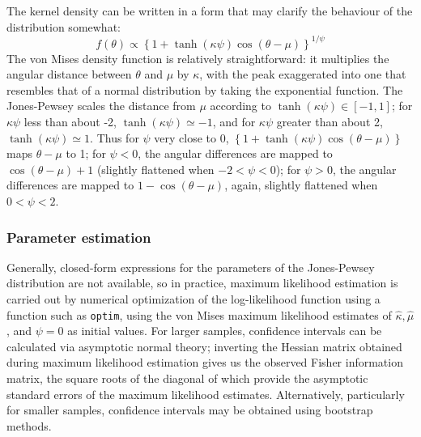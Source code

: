 \documentclass[../../ArchStats.tex]{subfiles}
\begin{document}


The kernel density can be written in a form that may clarify the behaviour of the distribution somewhat:
\[ f(\theta) \propto \left\lbrace 1 + \tanh(\kappa \psi) \cos (\theta - \mu) \right\rbrace ^{1/\psi}\]
The von Mises density function is relatively straightforward: it multiplies the angular distance between $\theta$ and $\mu$ by $\kappa$, with the peak exaggerated into one that resembles that of a normal distribution by taking the exponential function. The Jones-Pewsey scales the distance from $\mu$ according to $\tanh(\kappa\psi) \in [-1,1] $; for $\kappa \psi$ less than about -2, $\tanh(\kappa\psi) \simeq -1$, and for $\kappa \psi$ greater than about 2, $\tanh(\kappa\psi) \simeq 1$. Thus for $\psi$ very close to 0, $\left\lbrace 1 + \tanh(\kappa \psi) \cos (\theta - \mu) \right\rbrace$ maps $\theta - \mu$ to 1; for $\psi < 0$, the angular differences are mapped to $\cos (\theta - \mu) + 1$ (slightly flattened when $-2 < \psi < 0$); for $\psi > 0$, the angular differences are mapped to $1 - \cos (\theta - \mu)$, again, slightly flattened when $0 < \psi < 2$.

\subsubsection{Parameter estimation}

Generally, closed-form expressions for the parameters of the Jones-Pewsey distribution are not available, so in practice, maximum likelihood estimation is carried out by numerical optimization of the log-likelihood function using a function such as \texttt{optim}, using the von Mises maximum likelihood estimates of $\hat{\kappa}, \hat{\mu}$, and $\psi = 0$ as initial values. For larger samples, confidence intervals can be calculated via asymptotic normal theory; inverting the Hessian matrix obtained during maximum likelihood estimation gives us the observed Fisher information matrix, the square roots of the diagonal of which provide the asymptotic standard errors of the maximum likelihood estimates. Alternatively, particularly for smaller samples, confidence intervals may be obtained using bootstrap methods.
\end{document}
